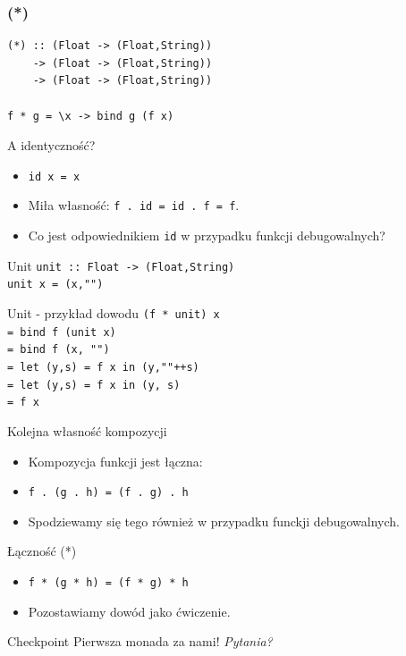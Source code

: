 \documentclass[14pt]{beamer}
\begin{document}
\begin{frame}[fragile]
\frametitle{(*)}
\begin{verbatim}
(*) :: (Float -> (Float,String))
    -> (Float -> (Float,String))
    -> (Float -> (Float,String))

f * g = \x -> bind g (f x)
\end{verbatim}
\end{frame}

\begin{frame}{A identyczność?}
    \begin{itemize}
        \item \texttt{id x = x}
        \item Miła własność: \texttt{f . id = id . f = f}.
        \item Co jest odpowiednikiem \texttt{id} w przypadku
            funkcji debugowalnych?
    \end{itemize}
\end{frame}

\begin{frame}{Unit}
    \texttt{unit :: Float -> (Float,String)\\
    unit x = (x,"")}
\end{frame}

\begin{frame}{Unit - przykład dowodu}
    \texttt{(f * unit) x\\
        = bind f (unit x)\\
        = bind f (x, "")\\
        = let (y,s) = f x in (y,""++s)\\
        = let (y,s) = f x in (y, s)\\
        = f x
    }
\end{frame}

\begin{frame}{Kolejna własność kompozycji}
    \begin{itemize}
        \item Kompozycja funkcji jest łączna:
        \item \texttt{f . (g . h) = (f . g) . h}
        \item Spodziewamy się tego również w przypadku funckji debugowalnych.
    \end{itemize}
\end{frame}

\begin{frame}{Łączność (*)}
    \begin{itemize}
        \item \texttt{f * (g * h) = (f * g) * h}
        \pause
        \item Pozostawiamy dowód jako ćwiczenie.
    \end{itemize}
\end{frame}

\begin{frame}{Checkpoint}
    Pierwsza monada za nami! \emph{Pytania?}
\end{frame}
\end{document}
